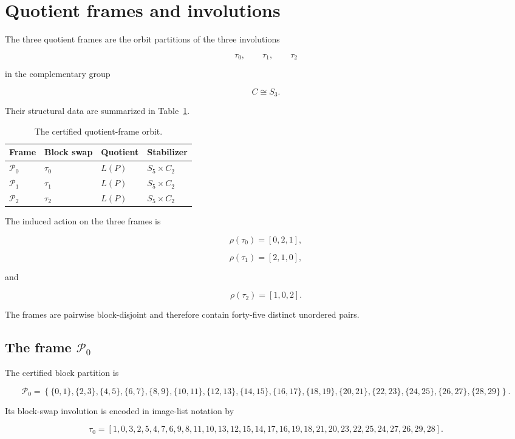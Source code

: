 \section{Quotient frames and involutions}

The three quotient frames are the orbit partitions of the three
involutions

\[
\tau_0,
\qquad
\tau_1,
\qquad
\tau_2
\]

in the complementary group

\[
C\cong S_3.
\]

Their structural data are summarized in
Table~\ref{tab:frame-summary}.

\begin{table}[h]
\centering
\begin{tabular}{llll}
\toprule
Frame & Block swap & Quotient & Stabilizer\\
\midrule
\(\mathcal P_0\) & \(\tau_0\) & \(L(P)\) & \(S_5\times C_2\)\\
\(\mathcal P_1\) & \(\tau_1\) & \(L(P)\) & \(S_5\times C_2\)\\
\(\mathcal P_2\) & \(\tau_2\) & \(L(P)\) & \(S_5\times C_2\)\\
\bottomrule
\end{tabular}
\caption{The certified quotient-frame orbit.}
\label{tab:frame-summary}
\end{table}

The induced action on the three frames is

\[
\rho(\tau_0)=[0,2,1],
\]

\[
\rho(\tau_1)=[2,1,0],
\]

and

\[
\rho(\tau_2)=[1,0,2].
\]

The frames are pairwise block-disjoint and therefore contain forty-five
distinct unordered pairs.

\subsection{The frame \(\mathcal P_0\)}

The certified block partition is

\[
\mathcal P_0
=
\left\{
  \{0,1\}, \{2,3\}, \{4,5\}, \{6,7\}, \{8,9\},
  \{10,11\}, \{12,13\}, \{14,15\}, \{16,17\}, \{18,19\},
  \{20,21\}, \{22,23\}, \{24,25\}, \{26,27\}, \{28,29\}
\right\}.
\]

Its block-swap involution is encoded in image-list notation by

\[
\tau_0
=
\left[
  1, 0, 3, 2, 5, 4, 7, 6, 9, 8,
  11, 10, 13, 12, 15, 14, 17, 16, 19, 18,
  21, 20, 23, 22, 25, 24, 27, 26, 29, 28
\right].
\]

